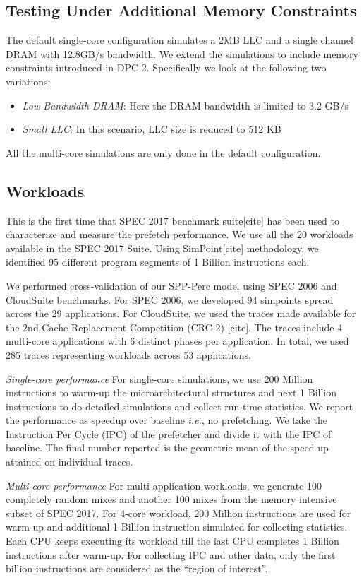 \documentclass{sig-alternate}
\begin{document}
\subsection{Testing Under Additional Memory Constraints}
The default single-core configuration simulates a 2MB LLC and a single channel DRAM with 12.8GB/s bandwidth. 
We extend the simulations to include memory constraints introduced in DPC-2. 
Specifically we look at the following two variations:
\begin{itemize}
    \item \textit{Low Bandwidth DRAM}: Here the DRAM bandwidth is limited to 3.2 GB/s
    \item \textit{Small LLC}: In this scenario, LLC size is reduced to 512 KB
\end{itemize}
All the multi-core simulations are only done in the default configuration.

\subsection{Workloads}
This is the first time that SPEC 2017 benchmark suite[cite] has been used to characterize and measure the prefetch performance. 
We use all the 20 workloads available in the SPEC 2017 Suite. 
Using SimPoint[cite] methodology, we identified 95 different program segments of 1 Billion instructions each.

We performed cross-validation of our SPP-Perc model using SPEC 2006 and CloudSuite benchmarks.
For SPEC 2006, we developed 94 simpoints spread across the 29 applications.
For CloudSuite, we used the traces made available for the 2nd Cache Replacement Competition (CRC-2) [cite].
The traces include 4 multi-core applications with 6 distinct phases per application. 
In total, we used 285 traces representing workloads across 53 applications. 

\textit{Single-core performance} For single-core simulations, we use 200 Million instructions to warm-up the microarchitectural structures and next 1 Billion instructions to do detailed simulations and collect run-time statistics. 
We report the performance as speedup over baseline \textit{i.e.}, no prefetching. 
We take the Instruction Per Cycle (IPC) of the prefetcher and divide it with the IPC of baseline. 
The final number reported is the geometric mean of the speed-up attained on individual traces.

\textit{Multi-core performance} For multi-application workloads, we generate 100 completely random mixes and another 100 mixes from the memory intensive subset of SPEC 2017.
For 4-core workload, 200 Million instructions are used for warm-up and additional 1 Billion instruction simulated for collecting statistics. 
Each CPU keeps executing its workload till the last CPU completes 1 Billion instructions after warm-up. 
For collecting IPC and other data, only the first billion instructions are considered as the ``region of interest''. 
\end{document}
